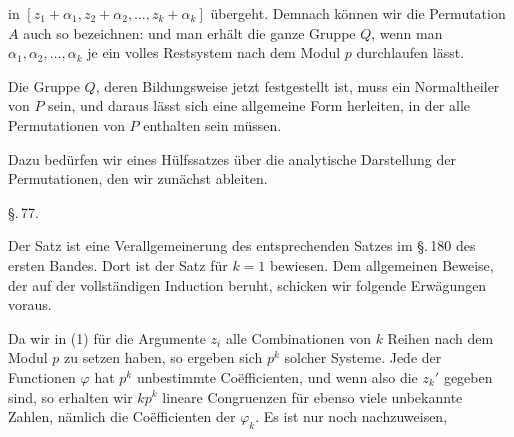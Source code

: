 in $[z_1+\alpha_1, z_2+\alpha_2, \ldots, z_k+\alpha_k]$ \"ubergeht. Demnach k\"onnen wir die Permutation $A$ auch so bezeichnen:
und man erh\"alt die ganze Gruppe $Q$, wenn man $\alpha_1, \alpha_2, \ldots, \alpha_k$ je ein volles Restsystem nach dem Modul $p$ durchlaufen l\"asst.

Die Gruppe $Q$, deren Bildungsweise jetzt festgestellt ist, muss ein Normaltheiler von $P$ sein, und daraus l\"asst sich eine allgemeine Form herleiten, in der alle Permutationen von $P$ enthalten sein m\"ussen.

Dazu bed\"urfen wir eines H\"ulfssatzes \"uber die analytische Darstellung der Permutationen, den wir zun\"achst ableiten.

\begin{center}
\S.\,77.\\
\end{center}


Der Satz ist eine Verallgemeinerung des entsprechenden Satzes im \S.\,180 des ersten Bandes. Dort ist der Satz f\"ur $k = 1$ bewiesen. Dem allgemeinen Beweise, der auf der vollst\"andigen Induction beruht, schicken wir folgende Erw\"agungen voraus.

Da wir in (1) f\"ur die Argumente $z_i$ alle Combinationen von $k$ Reihen nach dem Modul $p$ zu setzen haben, so ergeben sich $p^k$ solcher Systeme. Jede der Functionen $\varphi$ hat $p^k$ unbestimmte Co\"efficienten, und wenn also die $z_k'$ gegeben sind, so erhalten wir $kp^k$ lineare Congruenzen f\"ur ebenso viele unbekannte Zahlen, n\"amlich die Co\"efficienten der $\varphi_k$. Es ist nur noch nachzuweisen,
